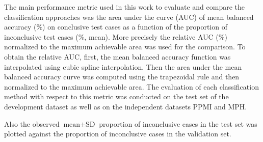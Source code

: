 
The main performance metric used in this work to evaluate and compare the classification approaches was 
the area under the curve (AUC) of mean balanced accuracy (\%) on conclusive test cases as a function of 
the proportion of inconclusive test cases (\%, mean).
More precisely the relative AUC (\%) normalized to the maximum achievable area was used for the comparison.
To obtain the relative AUC, 
first, the mean balanced accuracy function was interpolated using cubic spline interpolation.
Then the area under the mean balanced accuracy curve was computed using the trapezoidal rule 
and then normalized to the maximum achievable area.
The evaluation of each classification method with respect to this metric was conducted on the test set of the 
development dataset as well as on the independent datasets PPMI and MPH.


Also the observed $\text{mean} \pm \text{SD}$ proportion of inconclusive cases in the test set was plotted 
against the proportion of inconclusive cases in the validation set.


